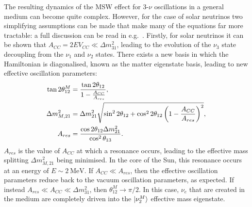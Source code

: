 The resulting dynamics of the MSW effect for 3-$\nu$ oscillations in a general medium can become quite complex. However, for the case of solar neutrinos two simplifying assumptions can be made that make many of the equations far more tractable: a full discussion can be read in e.g.~\cite{giuntiChapter13Phenomenology2007}. %
Firstly, for solar neutrinos it can be shown that $A_{CC} = 2EV_{CC} \ll \Delta m^{2}_{31}$, leading to the evolution of the $\nu_{3}$ state decoupling from the $\nu_{1}$ and $\nu_{2}$ states. There exists a new basis in which the Hamiltonian is diagonalised, known as the matter eigenstate basis, leading to new effective oscillation parameters: %
\begin{align}\label{eq:matter_osc_params}
    \tan{2\theta_{12}^{M}} &= \frac{\tan{2\theta_{12}}}{1-\frac{A_{CC}}{A_{res}}},\nonumber\\
    \Delta m^{2}_{M,21} &= \Delta m^{2}_{21}{}\sqrt{\sin^{2}2\theta_{12} + \cos^{2}2\theta_{12}\left(1-\frac{A_{CC}}{A_{res}}\right)^{2}},\\
    A_{res} &= \frac{\cos{2\theta_{12}\ensuremath{\Delta m^{2}_{21}}{}}}{\cos^{2}\theta_{13}}.\nonumber
\end{align}
$A_{res}$ is the value of $A_{CC}$ at which a resonance occurs, leading to the effective mass splitting $\Delta m^{2}_{M,21}$ being minimised. In the core of the Sun, this resonance occurs at an energy of $E\sim \SI{2}{\MeV}$. If $A_{CC} \ll A_{res}$, then the effective oscillation parameters reduce back to the vacuum oscillation parameters, as expected. If instead $A_{res} \ll A_{CC} \ll \Delta m^{2}_{31}$, then $\theta_{12}^{M}\to \pi/2$. In this case, $\nu_{e}$ that are created in the medium are completely driven into the $\ket{\nu_{2}^{M}}$ effective mass eigenstate.

